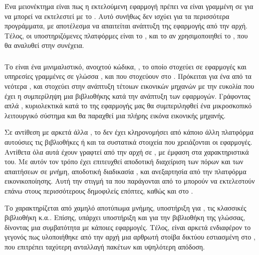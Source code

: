 Ένα μειονέκτημα είναι πως η εκτελούμενη εφαρμογή πρέπει να
είναι γραμμένη σε  για να μπορεί να εκτελεστεί με το
. Αυτό συνήθως δεν ισχύει για τα περισσότερα
προγράμματα, με αποτέλεσμα να απαιτείται ανάπτυξη της εφαρμογής
από την αρχή. Τέλος, οι υποστηριζόμενες πλατφόρμες είναι το
, και το  αν χρησιμοποιηθεί το , που
θα αναλυθεί στην συνέχεια.

\subsubsection{}

Το  είναι ένα μινιμαλιστικό, ανοιχτού κώδικα, 
, το οποίο στοχεύει σε εφαρμογές και υπηρεσίες
γραμμένες σε γλώσσα , και που στοχεύουν στο . Πρόκειται
για ένα από τα νεότερα , και στοχεύει στην
ανάπτυξη τέτοιων εικονικών μηχανών με την ευκολία που έχει η
συμπερίληψη μια βιβλιοθήκης κατά την ανάπτυξη των εφαρμογών.
Γράφοντας απλά , κυριολεκτικά κατά το  της
εφαρμογής μας θα συμπεριληφθεί ένα μικροσκοπικό λειτουργικό
σύστημα και θα παραχθεί μια πλήρης εικόνα εικονικής μηχανής\cite{includeOS}.
\newline

Σε αντίθεση με αρκετά άλλα , το δεν έχει
κληρονομήσει από κάποιο άλλη πλατφόρμα αυτούσιες τις
βιβλιοθήκες ή και τα συστατικά στοιχεία που χρειάζονται οι εφαρμογές.
Αντίθετα όλα αυτά έχουν γραφτεί από την
αρχή σε , με έμφαση στα  χαρακτηριστικά του.
Με αυτόν τον τρόπο έχει επιτευχθεί αποδοτική διαχείριση
των πόρων και των απαιτήσεων σε μνήμη, αποδοτική διαδικασία
, και ανεξαρτησία από την πλατφόρμα εικονικοποίησης.
Αυτή την στιγμή τα  που παράγονται από το
 μπορούν να εκτελεστούν επάνω στους περισσότερους
δημοφιλείς επόπτες, καθώς και στο \cite{Orestis}.
\newline

Το  χαρακτηρίζεται από χαμηλό αποτύπωμα μνήμης,
υποστήριξη για , τις κλασσικές βιβλιοθήκη  κ.α..
Επίσης, υπάρχει υποστήριξη και για την βιβλιοθήκη της 
γλώσσας, δίνοντας μια συμβατότητα με κάποιες  εφαρμογές\cite{includeOS}.
Τέλος, είναι αρκετά ενδιαφέρον το γεγονός πως υλοποιήθηκε από την αρχή
μια αρθρωτή στοίβα δικτύου εστιασμένη στο , που
επιτρέπει ταχύτερη ανταλλαγή πακέτων και υψηλότερη απόδοση.
\newline

